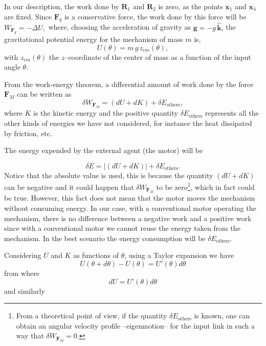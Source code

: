 \documentclass[11pt]{article}
\begin{document}
In our description, the work done by $\mathbf{R}_1$ and $\mathbf{R}_2$ 
is zero, as the points $\mathbf{x}_1$ and $\mathbf{x}_4$ are fixed.
Since $\mathbf{F}_g$ is a conservative force, the work done by this 
force will be  $W_{\mathbf{F}_g} = -\Delta U,$ where, choosing the 
acceleration of gravity as $\mathbf{g} = -g\, \hat{\mathbf{k}}$, the  
gravitational potential energy for the mechanism of mass $m$ is,
\begin{equation}
U(\theta) = m\,g\,z_{cm}(\theta),
\end{equation}
with $z_{cm}(\theta)$ the $z$--coordinate of the center of mass as a 
function of the input angle $\theta$.

From the work-energy theorem, a differential amount of work done by the 
force $\mathbf{F}_{M}$ can be written as
\begin{equation}
\delta W_{\mathbf{F}_{M}}= (dU +  dK) +  \delta E_{\text{others}},
\end{equation}
where $K$ is the kinetic energy and the positive quantity 
$\delta E_{\text{others}}$ represents all the other kinds of energies we 
have not considered, for instance the heat dissipated by friction, etc.

The energy expended by the external agent (the motor) will be

\begin{equation}
\delta E = |(dU +  dK)| + \delta E_{\text{others}}. 
\end{equation} 
Notice that the absolute value is used, this is because the quantity 
$(dU + dK)$ can be negative and it could happen that $\delta 
W_{\mathbf{F}_{M}}$ to be zero\footnote{From a theoretical point of 
view, if the quantity $\delta E_{\text{others}}$ is known, one can 
obtain an angular velocity profile --eigenmotion-- for the input link in 
such a way that $\delta W_{\mathbf{F}_{M}} = 0.$}, which in fact could 
be true. However, this fact does not mean that the motor moves the 
mechanism without consuming energy.  In our case, with a conventional 
motor operating the mechanism, there is no difference between a negative 
work and a positive work since with a conventional motor we cannot reuse 
the energy taken from the mechanism. In the best 
scenario the energy consumption will be $\delta E_{\text{others}}.$

Considering $U$ and $K$ as functions of $\theta$, using a Taylor 
expansion we have
\begin{equation}
U(\theta + d\theta) - U(\theta) =  U'(\theta) d\theta
\end{equation}
 from where 
 \begin{equation}\label{infinidu}
dU =  U'(\theta) d\theta
\end{equation}
and similarly 
\end{document}
